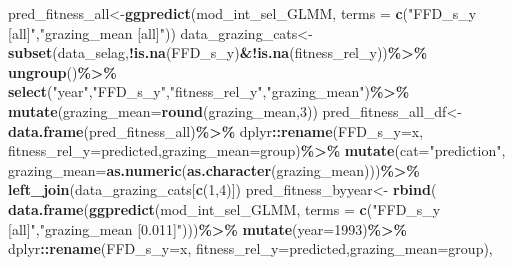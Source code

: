 \documentclass[
]{article}
\newenvironment{Shaded}{\begin{snugshade}}{\end{snugshade}}
\newcommand{\DataTypeTok}[1]{\textcolor[rgb]{0.13,0.29,0.53}{#1}}
\newcommand{\DecValTok}[1]{\textcolor[rgb]{0.00,0.00,0.81}{#1}}
\newcommand{\KeywordTok}[1]{\textcolor[rgb]{0.13,0.29,0.53}{\textbf{#1}}}
\newcommand{\NormalTok}[1]{#1}
\newcommand{\OperatorTok}[1]{\textcolor[rgb]{0.81,0.36,0.00}{\textbf{#1}}}
\newcommand{\StringTok}[1]{\textcolor[rgb]{0.31,0.60,0.02}{#1}}
\begin{document}
\begin{Shaded}
\begin{Highlighting}[]
\NormalTok{pred\_fitness\_all\textless{}{-}}\KeywordTok{ggpredict}\NormalTok{(mod\_int\_sel\_GLMM,}
                        \DataTypeTok{terms =} \KeywordTok{c}\NormalTok{(}\StringTok{"FFD\_s\_y [all]"}\NormalTok{,}\StringTok{"grazing\_mean [all]"}\NormalTok{))}
\NormalTok{data\_grazing\_cats\textless{}{-}}\KeywordTok{subset}\NormalTok{(data\_selag,}\OperatorTok{!}\KeywordTok{is.na}\NormalTok{(FFD\_s\_y)}\OperatorTok{\&!}\KeywordTok{is.na}\NormalTok{(fitness\_rel\_y))}\OperatorTok{\%\textgreater{}\%}
\StringTok{  }\KeywordTok{ungroup}\NormalTok{()}\OperatorTok{\%\textgreater{}\%}
\StringTok{  }\KeywordTok{select}\NormalTok{(}\StringTok{"year"}\NormalTok{,}\StringTok{"FFD\_s\_y"}\NormalTok{,}\StringTok{"fitness\_rel\_y"}\NormalTok{,}\StringTok{"grazing\_mean"}\NormalTok{)}\OperatorTok{\%\textgreater{}\%}
\StringTok{  }\KeywordTok{mutate}\NormalTok{(}\DataTypeTok{grazing\_mean=}\KeywordTok{round}\NormalTok{(grazing\_mean,}\DecValTok{3}\NormalTok{))}
\NormalTok{pred\_fitness\_all\_df\textless{}{-}}\KeywordTok{data.frame}\NormalTok{(pred\_fitness\_all)}\OperatorTok{\%\textgreater{}\%}
\StringTok{  }\NormalTok{dplyr}\OperatorTok{::}\KeywordTok{rename}\NormalTok{(}\DataTypeTok{FFD\_s\_y=}\NormalTok{x, }\DataTypeTok{fitness\_rel\_y=}\NormalTok{predicted,}\DataTypeTok{grazing\_mean=}\NormalTok{group)}\OperatorTok{\%\textgreater{}\%}
\StringTok{  }\KeywordTok{mutate}\NormalTok{(}\DataTypeTok{cat=}\StringTok{"prediction"}\NormalTok{,}
         \DataTypeTok{grazing\_mean=}\KeywordTok{as.numeric}\NormalTok{(}\KeywordTok{as.character}\NormalTok{(grazing\_mean)))}\OperatorTok{\%\textgreater{}\%}
\StringTok{  }\KeywordTok{left\_join}\NormalTok{(data\_grazing\_cats[}\KeywordTok{c}\NormalTok{(}\DecValTok{1}\NormalTok{,}\DecValTok{4}\NormalTok{)])}
\NormalTok{pred\_fitness\_byyear\textless{}{-}}
\StringTok{  }\KeywordTok{rbind}\NormalTok{(}
    \KeywordTok{data.frame}\NormalTok{(}\KeywordTok{ggpredict}\NormalTok{(mod\_int\_sel\_GLMM,}
                         \DataTypeTok{terms =} \KeywordTok{c}\NormalTok{(}\StringTok{"FFD\_s\_y [all]"}\NormalTok{,}\StringTok{"grazing\_mean [0.011]"}\NormalTok{)))}\OperatorTok{\%\textgreater{}\%}
\StringTok{      }\KeywordTok{mutate}\NormalTok{(}\DataTypeTok{year=}\DecValTok{1993}\NormalTok{)}\OperatorTok{\%\textgreater{}\%}
\StringTok{      }\NormalTok{dplyr}\OperatorTok{::}\KeywordTok{rename}\NormalTok{(}\DataTypeTok{FFD\_s\_y=}\NormalTok{x, }\DataTypeTok{fitness\_rel\_y=}\NormalTok{predicted,}\DataTypeTok{grazing\_mean=}\NormalTok{group),}

\end{Highlighting}
\end{Shaded}
\end{document}
